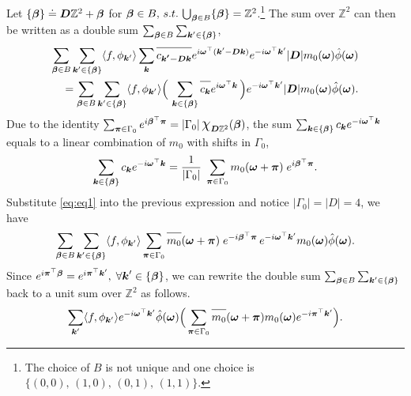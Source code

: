 Let $\{\boldsymbol{\beta}\}\doteq \boldsymbol{D}\mathbb{Z}^2+\boldsymbol{\beta}$ for $\boldsymbol{\beta}\in B, \,s.t.\,\bigcup_{\boldsymbol{\beta}\in B} \{\boldsymbol{\beta}\} = \mathbb{Z}^2$.\footnote{The choice of $B$ is not unique and one choice is $ \{ (0,0),\,(1,0),\,(0,1),\,(1,1)\}$.}  The sum over $\mathbb{Z}^2$ can then be written as a double sum $\sum_{\boldsymbol{\beta}\in B}\sum_{\boldsymbol{k}'\in \{\boldsymbol{\beta}\}}$,
\begin{align*}
\sum_{\V{\beta}\in B}\sum_{\V{k}'\in\{\V{\beta}\}} \langle f,\phi_{\V{k}'}\rangle\sum_{\V{k}}\overlinespace{c_{\V{k'-Dk}}}e^{i\V{\omega}^\top(\V{k}'-\V{Dk})}e^{-i\V{\omega}^\top\V{k}'}|\V{D}|m_0(\V{\omega})\hat{\phi}(\V{\omega})\\
=\sum_{\V{\beta}\in B}\sum_{\V{k}'\in\{\V{\beta}\}} \langle f,\phi_{\V{k}'}\rangle\Big(\,\sum_{\V{k}\in\{\V{\beta}\}}\overlinespace{c_{\V{k}}}e^{i\V{\omega}^\top\V{k}}\,\Big)e^{-i\V{\omega}^\top\V{k}'}|\V{D}|m_0(\V{\omega})\hat{\phi}(\V{\omega}).
\end{align*}
Due to the identity $\sum_{\V{\pi}\in\Gamma_0}e^{i\V{\beta}^\top\V{\pi}} = |\Gamma_0| \, \scalebox{1.3}{$\chi$}_{\V{D}\mathbb{Z}^2}(\V{\beta})$, the sum $\sum_{\boldsymbol{k}\in \{\boldsymbol{\beta}\}}c_{\boldsymbol{k}}e^{-i\boldsymbol{\omega}^\top\boldsymbol{k}}$ equals to a linear combination of  $m_0$ with shifts in $\Gamma_0$,
\begin{align}\label{eq:eq1}
\sum_{\boldsymbol{k}\in \{\boldsymbol{\beta}\}}c_{\boldsymbol{k}}e^{-i\boldsymbol{\omega}^\top\boldsymbol{k}}
= \frac{1}{|\Gamma_0|}\;\sum_{\boldsymbol{\pi}\in\Gamma_0}m_0(\boldsymbol{\omega}+\boldsymbol{\pi})\;e^{i\boldsymbol{\beta}^\top\boldsymbol{\pi}} .
\end{align}
Substitute \eqref{eq:eq1} into the previous expression and notice $|\Gamma_0| = |D|=4$, we have
\begin{align*}
\sum_{\V{\beta}\in B}\sum_{\V{k}'\in \{\V{\beta}\}}\langle f,\phi_{\V{k}'}\rangle\sum_{\V{\pi}\in\Gamma_0}\overlinespace{m_0}(\V{\omega}+\V{\pi})\;e^{-i\V{\beta}^\top\V{\pi}}\,e^{-i\V{\omega}^\top\V{k}'}m_0(\V{\omega})\hat{\phi}(\V{\omega}).
\end{align*}
Since $e^{i \boldsymbol{\pi}^\top\boldsymbol{\beta}}=e^{i\boldsymbol{\pi}^\top\boldsymbol{k}'},\; \forall \boldsymbol{k}'\in \{\boldsymbol{\beta}\} $, we can rewrite the double sum $\sum_{\boldsymbol{\beta}\in B}\sum_{\boldsymbol{k}'\in \{\boldsymbol{\beta}\}} $  back to a unit sum over $\mathbb{Z}^2$ as follows.
\begin{align*}
\sum_{\V{k}'}\langle f,\phi_{\V{k}'}\rangle e^{-i\V{\omega} ^\top\V{k}'}\hat{\phi}(\V{\omega})\Big(\sum_{\V{\pi}\in\Gamma_0}\overlinespace{m_0}(\V{\omega}+\V{\pi})m_0(\V{\omega})e^{-i\V{\pi}^\top\V{k}'} \Big).
\end{align*}

